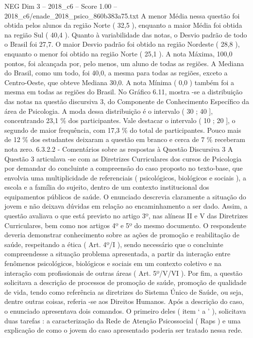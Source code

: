 \begin{textsample}{NEG Dim 3 – 2018\_c6 – Score 1.00 – 2018\_c6/enade\_2018\_psico\_860b383a75.txt}
A menor Média nessa questão foi obtida pelos alunos da região Norte ( 32,5 ), enquanto a maior Média foi obtida na região Sul ( 40,4 ).
Quanto à variabilidade das notas, o Desvio padrão de todo o Brasil foi 27,7.
O maior Desvio padrão foi obtido na região Nordeste ( 28,8 ), enquanto o menor foi obtido na região Norte ( 25,1 ).
A nota Máxima, 100,0 pontos, foi alcançada por, pelo menos, um aluno de todas as regiões.
A Mediana do Brasil, como um todo, foi 40,0, a mesma para todas as regiões, exceto a Centro-Oeste, que obteve Mediana 30,0.
A nota Mínima ( 0,0 ) também foi a mesma em todas as regiões do Brasil.
No Gráfico 6.11, mostra -se a distribuição das notas na questão discursiva 3, do Componente de Conhecimento Específico da área de Psicologia.
A moda dessa distribuição é o intervalo ( 30 ; 40 ], concentrando 23,1 \% dos participantes.
Vale destacar o intervalo ( 10 ; 20 ], o segundo de maior frequência, com 17,3 \% do total de participantes.
Pouco mais de 12 \% dos estudantes deixaram a questão em branco e cerca de 7 \% receberam nota zero. 6.3.2.2 - Comentários sobre as respostas à Questão Discursiva 3 A Questão 3 articulava -se com as Diretrizes Curriculares dos cursos de Psicologia por demandar do concluinte a compreensão do caso proposto no texto-base, que envolvia uma multiplicidade de referenciais ( psicológicos, biológicos e sociais ), a escola e a família do sujeito, dentro de um contexto institucional dos equipamentos públicos de saúde.
O enunciado descrevia claramente a situação do jovem e não deixava dúvidas em relação ao encaminhamento a ser dado.
Assim, a questão avaliava o que está previsto no artigo 3º, nas alíneas II e V das Diretrizes Curriculares, bem como nos artigos 4º e 5º do mesmo documento.
O respondente deveria demonstrar conhecimento sobre as ações de promoção e reabilitação de saúde, respeitando a ética ( Art. 4º/I ), sendo necessário que o concluinte compreendesse a situação problema apresentada, a partir da interação entre fenômenos psicológicos, biológicos e sociais em um contexto coletivo e na interação com profissionais de outras áreas ( Art. 5º/V/VI ).
Por fim, a questão solicitava a descrição de processos de promoção de saúde, promoção de qualidade de vida, tendo como referência as diretrizes do Sistema Único de Saúde, ou seja, dentre outras coisas, referia -se aos Direitos Humanos.
Após a descrição do caso, o enunciado apresentava dois comandos.
O primeiro deles ( item ‘ a ’ ), solicitava duas tarefas : a caracterização da Rede de Atenção Psicossocial ( Raps ) e uma explicação de como o jovem do caso apresentado poderia ser tratado nessa rede.

\end{textsample}
